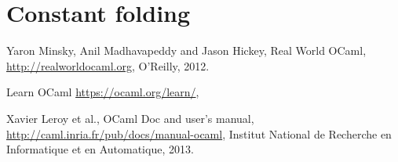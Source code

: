 \documentclass{article}
\begin{document}
\section{Constant folding}
\begin{thebibliography}{9}

	Yaron Minsky, Anil Madhavapeddy and Jason Hickey,
	Real World OCaml,
	\url{http://realworldocaml.org},
	O'Reilly,
	2012.

	Learn OCaml
	\url{https://ocaml.org/learn/},

	Xavier Leroy et al.,
	OCaml Doc and user's manual,
	\url{http://caml.inria.fr/pub/docs/manual-ocaml},
	Institut National de Recherche en Informatique et en Automatique,
	2013.

\end{thebibliography}
\end{document}
